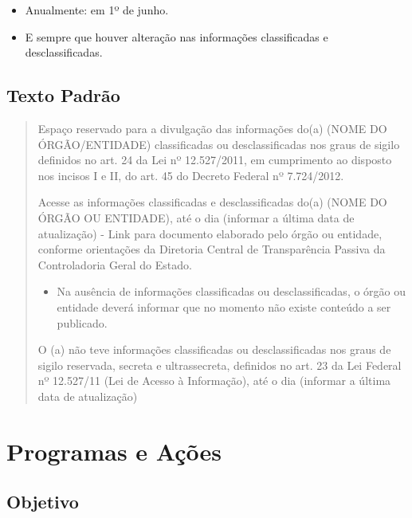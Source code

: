 \documentclass[
]{book}
\providecommand{\tightlist}{%
  \setlength{\itemsep}{0pt}\setlength{\parskip}{0pt}}
\begin{document}
\begin{itemize}
\tightlist
\item
  Anualmente: em 1º de junho.
\item
  E sempre que houver alteração nas informações classificadas e desclassificadas.
\end{itemize}

\hypertarget{texto-padruxe3o-2}{%
\subsection{Texto Padrão}\label{texto-padruxe3o-2}}

\begin{quote}
Espaço reservado para a divulgação das informações do(a) (NOME DO ÓRGÃO/ENTIDADE) classificadas ou desclassificadas nos graus de sigilo definidos no art. 24 da Lei nº 12.527/2011, em cumprimento ao disposto nos incisos I e II, do art. 45 do Decreto Federal nº 7.724/2012.

Acesse as informações classificadas e desclassificadas do(a) (NOME DO ÓRGÃO OU ENTIDADE), até o dia (informar a última data de atualização)
- Link para documento elaborado pelo órgão ou entidade, conforme orientações da Diretoria Central de Transparência Passiva da Controladoria Geral do Estado.

\begin{itemize}
\tightlist
\item
  Na ausência de informações classificadas ou desclassificadas, o órgão ou entidade deverá informar que no momento não existe conteúdo a ser publicado.
\end{itemize}

O (a) não teve informações classificadas ou desclassificadas nos graus de sigilo reservada, secreta e ultrassecreta, definidos no art. 23 da Lei Federal nº 12.527/11 (Lei de Acesso à Informação), até o dia (informar a última data de atualização)
\end{quote}

\hypertarget{programas-e-auxe7uxf5es}{%
\section{Programas e Ações}\label{programas-e-auxe7uxf5es}}

\hypertarget{objetivo-2}{%
\subsection{Objetivo}\label{objetivo-2}}
\end{document}
